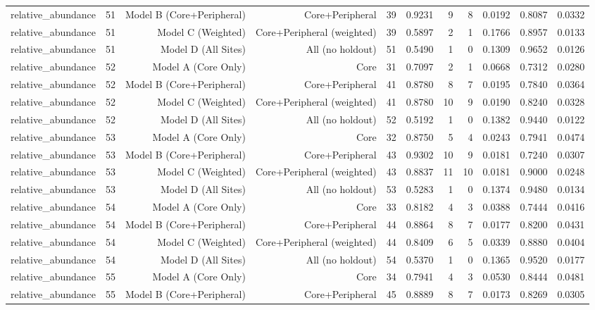 {\begin{longtable}{lrrrrrrrrrr}
  relative\_abundance & 51 & Model B (Core+Peripheral) & Core+Peripheral & 39 & 0.9231 & 9 & 8 & 0.0192 & 0.8087 & 0.0332 \\
  relative\_abundance & 51 & Model C (Weighted) & Core+Peripheral (weighted) & 39 & 0.5897 & 2 & 1 & 0.1766 & 0.8957 & 0.0133 \\
  relative\_abundance & 51 & Model D (All Sites) & All (no holdout) & 51 & 0.5490 & 1 & 0 & 0.1309 & 0.9652 & 0.0126 \\
  relative\_abundance & 52 & Model A (Core Only) & Core & 31 & 0.7097 & 2 & 1 & 0.0668 & 0.7312 & 0.0280 \\
  relative\_abundance & 52 & Model B (Core+Peripheral) & Core+Peripheral & 41 & 0.8780 & 8 & 7 & 0.0195 & 0.7840 & 0.0364 \\
  relative\_abundance & 52 & Model C (Weighted) & Core+Peripheral (weighted) & 41 & 0.8780 & 10 & 9 & 0.0190 & 0.8240 & 0.0328 \\
  relative\_abundance & 52 & Model D (All Sites) & All (no holdout) & 52 & 0.5192 & 1 & 0 & 0.1382 & 0.9440 & 0.0122 \\
  relative\_abundance & 53 & Model A (Core Only) & Core & 32 & 0.8750 & 5 & 4 & 0.0243 & 0.7941 & 0.0474 \\
  relative\_abundance & 53 & Model B (Core+Peripheral) & Core+Peripheral & 43 & 0.9302 & 10 & 9 & 0.0181 & 0.7240 & 0.0307 \\
  relative\_abundance & 53 & Model C (Weighted) & Core+Peripheral (weighted) & 43 & 0.8837 & 11 & 10 & 0.0181 & 0.9000 & 0.0248 \\
  relative\_abundance & 53 & Model D (All Sites) & All (no holdout) & 53 & 0.5283 & 1 & 0 & 0.1374 & 0.9480 & 0.0134 \\
  relative\_abundance & 54 & Model A (Core Only) & Core & 33 & 0.8182 & 4 & 3 & 0.0388 & 0.7444 & 0.0416 \\
  relative\_abundance & 54 & Model B (Core+Peripheral) & Core+Peripheral & 44 & 0.8864 & 8 & 7 & 0.0177 & 0.8200 & 0.0431 \\
  relative\_abundance & 54 & Model C (Weighted) & Core+Peripheral (weighted) & 44 & 0.8409 & 6 & 5 & 0.0339 & 0.8880 & 0.0404 \\
  relative\_abundance & 54 & Model D (All Sites) & All (no holdout) & 54 & 0.5370 & 1 & 0 & 0.1365 & 0.9520 & 0.0177 \\
  relative\_abundance & 55 & Model A (Core Only) & Core & 34 & 0.7941 & 4 & 3 & 0.0530 & 0.8444 & 0.0481 \\
  relative\_abundance & 55 & Model B (Core+Peripheral) & Core+Peripheral & 45 & 0.8889 & 8 & 7 & 0.0173 & 0.8269 & 0.0305 \\

\end{longtable}}
